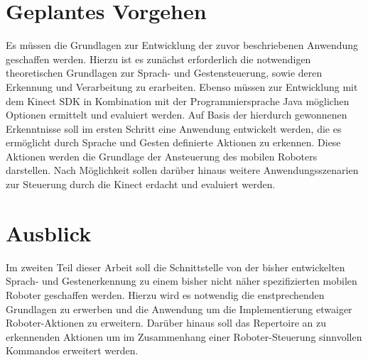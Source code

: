\section{Geplantes Vorgehen}


%

Es m\"ussen die Grundlagen zur Entwicklung der zuvor beschriebenen Anwendung geschaffen werden. 
Hierzu ist es zun\"achst erforderlich die notwendigen theoretischen Grundlagen zur Sprach- und Gestensteuerung, sowie deren Erkennung und Verarbeitung zu erarbeiten.
Ebenso m\"ussen  zur Entwicklung mit dem Kinect SDK in Kombination mit der Programmiersprache Java m\"oglichen Optionen ermittelt und evaluiert werden.
Auf Basis der hierdurch gewonnenen Erkenntnisse soll im ersten Schritt eine Anwendung entwickelt werden, die es erm\"oglicht durch Sprache und Gesten definierte Aktionen zu erkennen. 
Diese Aktionen werden die Grundlage der Ansteuerung des mobilen Roboters darstellen.
\newline
Nach M\"oglichkeit sollen dar\"uber hinaus weitere Anwendungsszenarien zur Steuerung durch die Kinect erdacht und evaluiert werden.

\section{Ausblick}


Im zweiten Teil dieser Arbeit soll die Schnittstelle von der bisher entwickelten Sprach- und Gestenerkennung zu einem bisher nicht n\"aher spezifizierten mobilen Roboter geschaffen werden.
Hierzu wird es notwendig die enstprechenden Grundlagen zu erwerben und die Anwendung um die Implementierung etwaiger Roboter-Aktionen zu erweitern.
Dar\"uber hinaus soll das Repertoire an zu erkennenden Aktionen um im Zusammenhang einer Roboter-Steuerung sinnvollen Kommandos erweitert werden.